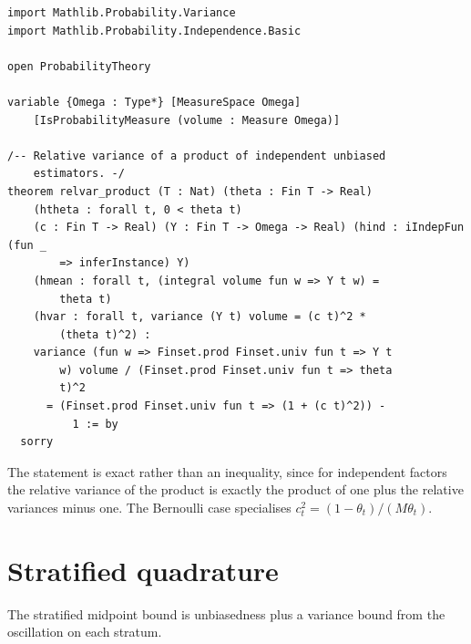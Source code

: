 \begin{footnotesize}
\begin{verbatim}
import Mathlib.Probability.Variance
import Mathlib.Probability.Independence.Basic

open ProbabilityTheory

variable {Omega : Type*} [MeasureSpace Omega]
    [IsProbabilityMeasure (volume : Measure Omega)]

/-- Relative variance of a product of independent unbiased
    estimators. -/
theorem relvar_product (T : Nat) (theta : Fin T -> Real)
    (htheta : forall t, 0 < theta t)
    (c : Fin T -> Real) (Y : Fin T -> Omega -> Real) (hind : iIndepFun (fun _
        => inferInstance) Y)
    (hmean : forall t, (integral volume fun w => Y t w) =
        theta t)
    (hvar : forall t, variance (Y t) volume = (c t)^2 *
        (theta t)^2) :
    variance (fun w => Finset.prod Finset.univ fun t => Y t
        w) volume / (Finset.prod Finset.univ fun t => theta
        t)^2
      = (Finset.prod Finset.univ fun t => (1 + (c t)^2)) -
          1 := by
  sorry
\end{verbatim}
\end{footnotesize}

The statement is exact rather than an inequality, since for independent factors the relative variance of the product is exactly the product of one plus the relative variances minus one. The Bernoulli case specialises $c_t^2 = (1 - \theta_t)/(M \theta_t)$.

\section{Stratified quadrature}

The stratified midpoint bound is unbiasedness plus a variance bound from the oscillation on each stratum.

